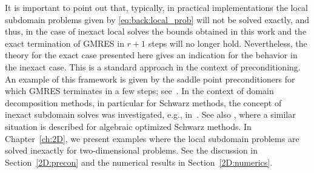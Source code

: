 It is important to point out that, typically, in practical implementations the
local subdomain problems given by \eqref{eq:back:local_prob} will not be solved
exactly, and thus, in the case of inexact local solves the bounds obtained in
this work and the exact termination of GMRES in $r+1$ steps will no longer hold.
Nevertheless, the theory for the exact case presented here gives an indication
for the behavior in the inexact case. This is a standard approach in the
context of preconditioning. An example of this framework is given by the
saddle point preconditioners for which GMRES terminates in a few
steps; see~\cite{BenWat08}. In the context of domain decomposition methods, in
particular for Schwarz methods, the concept of inexact subdomain solves was
investigated, e.g., in~\cite[\S~4]{BenFroNabSzy01}.
See also \cite{GanLoiSzy12}, where a similar situation is described for
algebraic optimized Schwarz methods. In Chapter~\ref{ch:2D}, we present examples where the local subdomain problems are solved inexactly for two-dimensional problems. See the discussion in Section~\ref{2D:precon} and the numerical results in Section~\ref{2D:numerics}.



